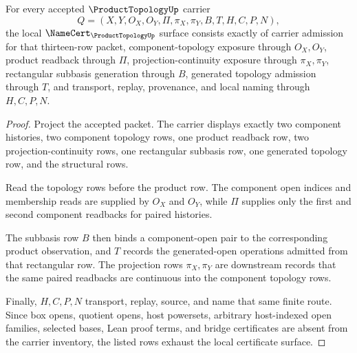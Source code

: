 \begin{theorem}
\label{thm:product-topology-namecert-obligations}
For every accepted $\ProductTopologyUp$ carrier
$$
Q=(X,Y,O_X,O_Y,\Pi,\pi_X,\pi_Y,B,T,H,C,P,N),
$$
the local $\NameCert_{\ProductTopologyUp}$ surface consists exactly of carrier admission for that thirteen-row packet, component-topology exposure through $O_X,O_Y$, product readback through $\Pi$, projection-continuity exposure through $\pi_X,\pi_Y$, rectangular subbasis generation through $B$, generated topology admission through $T$, and transport, replay, provenance, and local naming through $H,C,P,N$.
\end{theorem}
\begin{proof}
Project the accepted packet. The carrier displays exactly two component histories, two component topology rows, one product readback row, two projection-continuity rows, one rectangular subbasis row, one generated topology row, and the structural rows.

Read the topology rows before the product row. The component open indices and membership reads are supplied by $O_X$ and $O_Y$, while $\Pi$ supplies only the first and second component readbacks for paired histories.

The subbasis row $B$ then binds a component-open pair to the corresponding product observation, and $T$ records the generated-open operations admitted from that rectangular row. The projection rows $\pi_X,\pi_Y$ are downstream records that the same paired readbacks are continuous into the component topology rows.

Finally, $H,C,P,N$ transport, replay, source, and name that same finite route. Since box opens, quotient opens, host powersets, arbitrary host-indexed open families, selected bases, Lean proof terms, and bridge certificates are absent from the carrier inventory, the listed rows exhaust the local certificate surface.
\end{proof}

